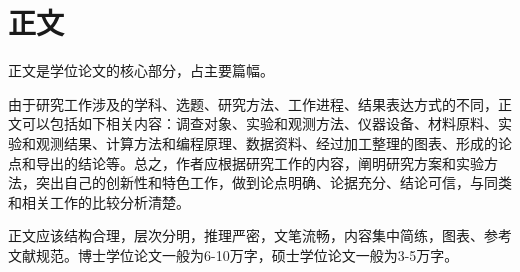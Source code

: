 \chapter{正文}
正文是学位论文的核心部分，占主要篇幅。

由于研究工作涉及的学科、选题、研究方法、工作进程、结果表达方式的不同，正文可以包括如下相关内容：调查对象、实验和观测方法、仪器设备、材料原料、实验和观测结果、计算方法和编程原理、数据资料、经过加工整理的图表、形成的论点和导出的结论等。总之，作者应根据研究工作的内容，阐明研究方案和实验方法，突出自己的创新性和特色工作，做到论点明确、论据充分、结论可信，与同类和相关工作的比较分析清楚。

正文应该结构合理，层次分明，推理严密，文笔流畅，内容集中简练，图表、参考文献规范。博士学位论文一般为6-10万字，硕士学位论文一般为3-5万字。